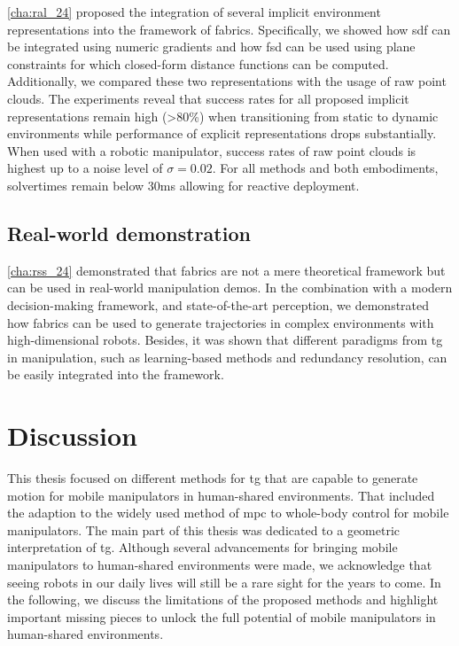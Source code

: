 \cref{cha:ral_24} proposed the integration of several implicit environment
representations into the framework of \ac{fabrics}. Specifically, we showed how
\ac{sdf} can be integrated using numeric gradients and how \ac{fsd} can be
used using plane constraints for which closed-form distance functions can be
computed. Additionally, we compared these two representations with the usage of
raw point clouds. The experiments reveal that success rates for all proposed
implicit representations remain high (>80\%) when transitioning from static to
dynamic environments while performance of explicit representations drops
substantially. When used with a robotic manipulator, success rates of raw point
clouds is highest up to a noise level of $\sigma=0.02$. For all methods and both
embodiments, solvertimes remain below 30ms allowing for reactive deployment.

\subsection{Real-world demonstration}
\label{sec:conclusion_real_world}

\cref{cha:rss_24} demonstrated that \ac{fabrics} are not a mere theoretical
framework but can be used in real-world manipulation demos. In the combination
with a modern decision-making framework, and state-of-the-art perception, 
we demonstrated how \ac{fabrics} can be used to generate trajectories in complex
environments with high-dimensional robots. Besides, it was shown that different
paradigms from \ac{tg} in manipulation, such as learning-based methods and
redundancy resolution, can be easily integrated into the framework.

\section{Discussion}
\label{sec:discussion}

This thesis focused on different methods for \ac{tg} that are capable to
generate motion for mobile manipulators in human-shared environments. That
included the adaption to the widely used method of \ac{mpc}
to whole-body control for mobile
manipulators. The main part of this thesis was dedicated to a geometric
interpretation of \ac{tg}. Although several advancements for bringing mobile
manipulators to human-shared environments were made, we acknowledge
that seeing robots in our daily lives will still be a rare sight for the years
to come. In the following, we discuss the limitations of the proposed methods
and highlight important missing pieces to unlock the full potential of mobile
manipulators in human-shared environments.

